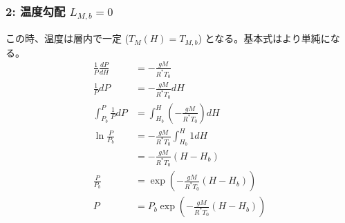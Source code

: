 \documentclass[a4paper,12pt]{article}
\begin{document}
\subsubsection*{2: 温度勾配 $L_{M,b} = 0$}
この時、温度は層内で一定 ($T_M(H) = T_{M,b}$) となる。基本式はより単純になる。
\begin{align*}
\frac{1}{P}\frac{dP}{dH}&=-\frac{gM}{R^*T_0}\\
\frac{1}{P}dP&=-\frac{gM}{R^*T_0}dH\\
\int_{P_b}^{P}\frac{1}{P}dP&=\int_{H_b}^{H}\left(-\frac{gM}{R^*T_0}\right)dH\\
\ln\frac{P}{P_b}&=-\frac{gM}{R^*T_0}\int_{H_b}^{H}1dH\\
&=-\frac{gM}{R^*T_0}(H-H_b)\\
\frac{P}{P_b}&=\exp (-\frac{gM}{R^*T_0}(H-H_b))\\
P &= P_b \exp (-\frac{gM}{R^*T_0}(H-H_b))\\
\end{align*}
\end{document}
